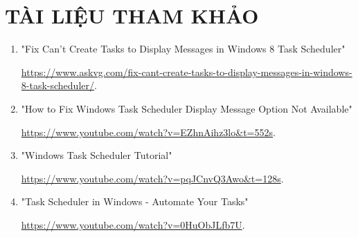 \documentclass[13pt]{article}
\begin{document}
\section*{\centering \fontsize{16}{20}\selectfont TÀI LIỆU THAM KHẢO}
\begin{enumerate}
    \item "Fix Can't Create Tasks to Display Messages in Windows 8 Task Scheduler"

    \url{https://www.askvg.com/fix-cant-create-tasks-to-display-messages-in-windows-8-task-scheduler/}.
    \item "How to Fix Windows Task Scheduler Display Message Option Not Available"

    \url{https://www.youtube.com/watch?v=EZhnAihz3lo&t=552s}.
    \item "Windows Task Scheduler Tutorial" 

    \url{https://www.youtube.com/watch?v=pqJCnvQ3Awo&t=128s}.
    \item "Task Scheduler in Windows - Automate Your Tasks"
    
    \url{https://www.youtube.com/watch?v=0HuObJLfb7U}.
\end{enumerate}
                
\end{document}
